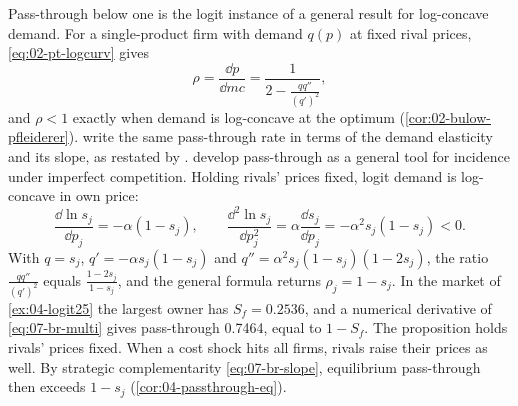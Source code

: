 Pass-through below one is the logit instance of a general result for log-concave demand. For a single-product firm
with demand $q(p)$ at fixed rival prices, \eqref{eq:02-pt-logcurv} gives
\begin{equation*}
  \rho = \frac{\dd p}{\dd mc} = \frac{1}{2 - \frac{q q''}{(q')^2}} ,
\end{equation*}
and $\rho < 1$ exactly when demand is log-concave at the optimum (\cref{cor:02-bulow-pfleiderer}).
\citet{BulowPfleiderer1983} write the same pass-through rate in terms of the demand elasticity and its slope, as
restated by \citet[p.~18 of the 2008 working paper]{FarrellShapiro2010}. \citet{WeylFabinger2013} develop pass-through
as a general tool for incidence under imperfect competition. Holding rivals' prices fixed, logit demand is log-concave
in own price:
\begin{equation*}
  \frac{\dd \ln s_j}{\dd p_j} = -\alpha(1 - s_j), \qquad \frac{\dd^2 \ln s_j}{\dd p_j^2} = \alpha\frac{\dd s_j}{\dd p_j}
  = -\alpha^2 s_j(1 - s_j) < 0 .
\end{equation*}
With $q = s_j$, $q' = -\alpha s_j(1 - s_j)$ and $q'' = \alpha^2 s_j(1 - s_j)(1 - 2s_j)$, the ratio $\frac{q
q''}{(q')^2}$ equals $\frac{1 - 2s_j}{1 - s_j}$, and the general formula returns $\rho_j = 1 - s_j$.
In the market of \cref{ex:04-logit25} the largest owner has $S_f = 0.2536$, and a numerical derivative of
\eqref{eq:07-br-multi} gives pass-through 0.7464, equal to $1 - S_f$. The proposition holds rivals' prices fixed.
When a cost shock hits all firms, rivals raise their prices as well. By strategic complementarity
\eqref{eq:07-br-slope}, equilibrium pass-through then exceeds $1 - s_j$ (\cref{cor:04-passthrough-eq}).

